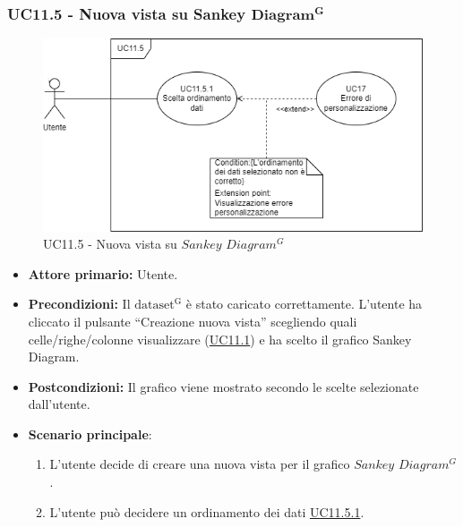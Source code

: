 \newpage

\subsubsection{UC11.5 - Nuova vista su Sankey ${\mathbf{Diagram^{G}}}$}
\label{sec:UC11.5}
\begin{figure}[h!]
	\centering
	\includegraphics[scale=0.60]{../../assets/creazionevista_sankey.png}
	\caption{UC11.5 - Nuova vista su $Sankey$ $Diagram^{G}$}
\end{figure}
\begin{itemize}
    \item \textbf{Attore primario:} Utente.
    \item \textbf{Precondizioni:} Il ${\mathrm{dataset^{G}}}$ è stato caricato correttamente. L'utente ha cliccato il pulsante ``Creazione nuova vista'' scegliendo quali celle/righe/colonne visualizzare (\hyperref[sec:UC11.1]{UC11.1}) e ha scelto il grafico Sankey Diagram.
    \item \textbf{Postcondizioni:} Il grafico viene mostrato secondo le scelte selezionate dall'utente.
    \item \textbf{Scenario principale}:
    \begin{enumerate}
		\item L'utente decide di creare una nuova vista per il grafico $Sankey$ $Diagram^{G}$.
		\item L'utente può decidere un ordinamento dei dati \hyperref[sec:UC11.5.1]{UC11.5.1}.
	\end{enumerate}
\end{itemize}

